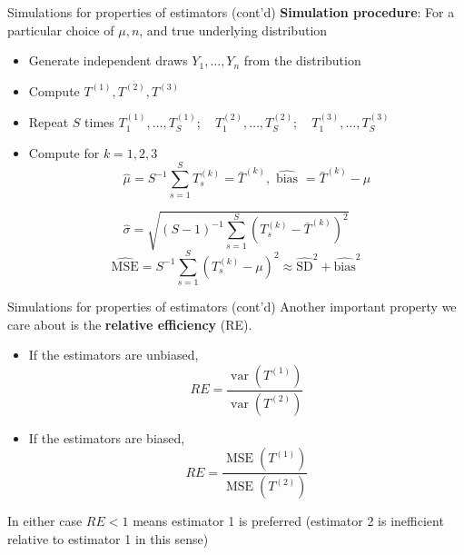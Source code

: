 \documentclass[
  ignorenonframetext,
]{beamer}
\begin{document}
\begin{frame}{Simulations for properties of estimators (cont'd)}
\protect{}\label{simulations-for-properties-of-estimators-contd}
\textbf{Simulation procedure}: For a particular choice of \(\mu, n\),
and true underlying distribution

\begin{itemize}
\item
  Generate independent draws \(Y_{1}, \ldots, Y_{n}\) from the
  distribution
\item
  Compute \(T^{(1)}, T^{(2)}, T^{(3)}\)
\item
  Repeat \(S\) times
  \(T_{1}^{(1)}, \ldots, T_{S}^{(1)} ; \quad T_{1}^{(2)}, \ldots, T_{S}^{(2)} ; \quad T_{1}^{(3)}, \ldots, T_{S}^{(3)}\)
\item
  Compute for \(k=1,2,3\) \[
  \widehat{\mu}=S^{-1} \sum_{s=1}^{S} T_{s}^{(k)}=\bar{T}^{(k)}, \widehat{\text { bias }}=\bar{T}^{(k)}-\mu
  \]
\end{itemize}

\[
\widehat{\sigma}=\sqrt{(S-1)^{-1} \sum_{s=1}^{S}\left(T_{s}^{(k)}-\bar{T}^{(k)}\right)^{2}}
\] \[
\widehat{\mathrm{MSE}}=S^{-1} \sum_{s=1}^{S}\left(T_{s}^{(k)}-\mu\right)^{2} \approx \widehat{\mathrm{SD}}^{2}+\widehat{\mathrm{bias}}^{2}
\]
\end{frame}

\begin{frame}{Simulations for properties of estimators (cont'd)}
\protect{}\label{simulations-for-properties-of-estimators-contd-1}
Another important property we care about is the \textbf{relative
efficiency} (RE).

\begin{itemize}
\item
  If the estimators are unbiased, \[
  R E=\frac{\operatorname{var}\left(T^{(1)}\right)}{\operatorname{var}\left(T^{(2)}\right)}
  \]
\item
  If the estimators are biased, \[
  R E=\frac{\operatorname{MSE}\left(T^{(1)}\right)}{\operatorname{MSE}\left(T^{(2)}\right)}
  \]
\end{itemize}

In either case \(R E<1\) means estimator 1 is preferred (estimator 2 is
inefficient relative to estimator 1 in this sense)
\end{frame}
\end{document}
